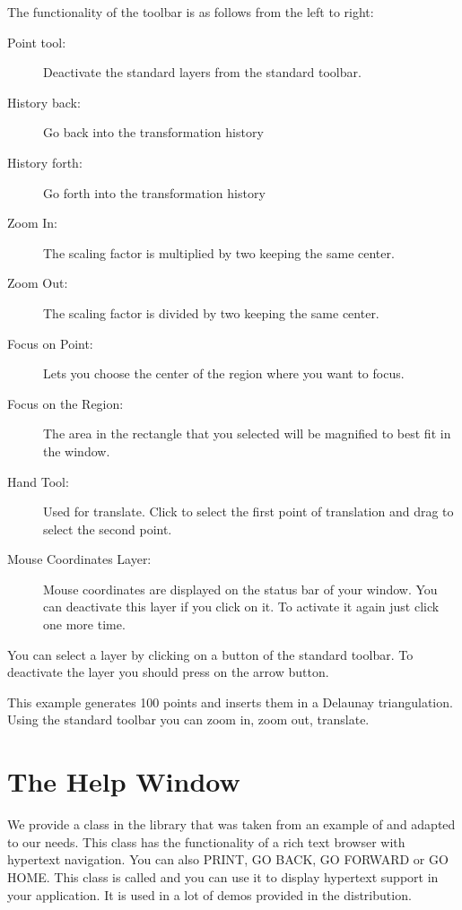 The functionality of the toolbar is as follows from the left to right:
\begin{description}
        \item[Point tool:] Deactivate the standard layers from the
standard toolbar.
        \item[History back:] Go back into the transformation history
        \item[History forth:] Go forth into the transformation history
        \item[Zoom In:] The scaling factor is multiplied by two
keeping the same center.
        \item[Zoom Out:] The scaling factor is divided by two keeping
the same center.
        \item[Focus on Point:] Lets you choose the center of the
region where you want to focus.
        \item[Focus on the Region:] The area in the rectangle that you selected will be magnified to best fit in the window.
        \item[Hand Tool:] Used for translate. Click to select the
first point of translation and drag to select the second point.
        \item[Mouse Coordinates Layer:] Mouse coordinates are
displayed on the status bar of your window. You can deactivate this
layer if you click on it. To activate it again just click one more time.
\end{description}

You can select a layer by clicking on a button of the standard
toolbar. To deactivate the layer you should press on the arrow button.

\ccExample
{}

This example generates 100 points and inserts them in a Delaunay
triangulation. Using the standard toolbar you can zoom in, zoom out,
translate.

\section{The Help Window}
\label{The Help Window}

We provide a class in the  library that was taken from
an example of  and adapted to our needs. This class has the
functionality of a rich text browser with hypertext navigation. You
can also PRINT, GO BACK, GO FORWARD or GO HOME. This class is called
 and you can use it to display hypertext support
in your application. It is used in a lot of demos provided in the
distribution.

